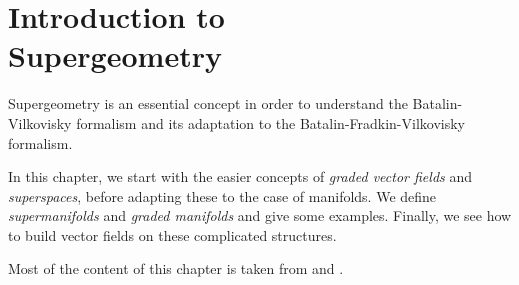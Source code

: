 \chapter[Introduction to Supergeometry]{Introduction to \\ Supergeometry}
\label{chap:intro_supergeom}

Supergeometry is an essential concept in order to understand the Batalin-Vilkovisky formalism and its adaptation to the Batalin-Fradkin-Vilkovisky formalism.

In this chapter, we start with the easier concepts of \emph{graded vector fields} and \emph{superspaces}, before adapting these to the case of manifolds.
We define \emph{supermanifolds} and \emph{graded manifolds} and give some examples.
Finally, we see how to build vector fields on these complicated structures.

Most of the content of this chapter is taken from \cite{Nima} and \cite{Intro_BV-BFV}.




